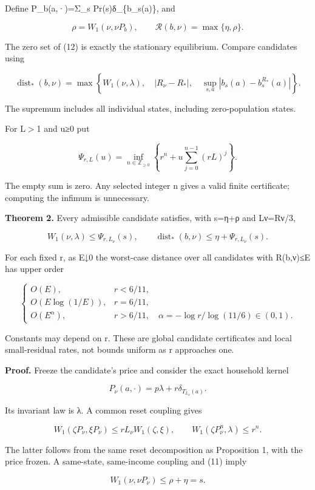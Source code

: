 \documentclass{article}
\begin{document}
Define P\_b(a,·)=Σ\_s Pr(s)δ\_\{b\_s(a)\}, and

\[
\rho=W_1(\nu,\nu P_b),\qquad
\mathcal R(b,\nu)=\max\{\eta,\rho\}.
\tag{12}
\]

The zero set of (12) is exactly the stationary equilibrium. Compare candidates using

\[
\operatorname{dist}_*(b,\nu)=
\max\left\{
W_1(\nu,\lambda),\quad
|R_\nu-R_*|,\quad
\sup_{s,a}|b_s(a)-b_s^{R_*}(a)|
\right\}.
\tag{13}
\]

The supremum includes all individual states, including zero-population states.

For L\(\gt\)1 and u≥0 put

\[
\Psi_{r,L}(u)=
\inf_{n\in\mathbb Z_{\ge0}}
\left\{r^n+u\sum_{j=0}^{n-1}(rL)^j\right\}.
\tag{14}
\]

The empty sum is zero. Any selected integer n gives a valid finite certificate; computing the infimum is unnecessary.

\textbf{Theorem 2.} Every admissible candidate satisfies, with s=η+ρ and Lν=Rν/3,

\[
W_1(\nu,\lambda)\le\Psi_{r,L_\nu}(s),\qquad
\operatorname{dist}_*(b,\nu)
\le\eta+\Psi_{r,L_\nu}(s).
\tag{15}
\]

For each fixed r, as E↓0 the worst-case distance over all candidates with R(b,ν)≤E has upper order

\[
\begin{cases}
O(E),&r<6/11,\\
O(E\log(1/E)),&r=6/11,\\
O(E^\alpha),&r>6/11,\quad
\alpha=-\log r/\log(11/6)\in(0,1).
\end{cases}
\tag{16}
\]

Constants may depend on r. These are global candidate certificates and local small-residual rates, not bounds uniform as r approaches one.

\textbf{Proof.} Freeze the candidate's price and consider the exact household kernel

\[
P_\nu(a,\cdot)=p\lambda+r\delta_{T_{L_\nu}(a)}.
\]

Its invariant law is λ. A common reset coupling gives

\[
W_1(\zeta P_\nu,\xi P_\nu)\le rL_\nu W_1(\zeta,\xi),
\qquad
W_1(\zeta P_\nu^n,\lambda)\le r^n .
\]

The latter follows from the same reset decomposition as Proposition 1, with the price frozen. A same-state, same-income coupling and (11) imply

\[
W_1(\nu,\nu P_\nu)\le\rho+\eta=s.
\]
\end{document}
